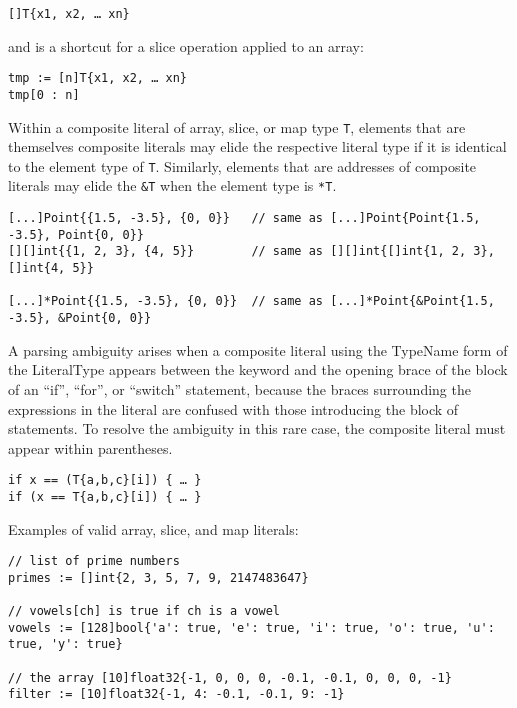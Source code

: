 {\begin{Verbatim}[frame=single]
[]T{x1, x2, … xn}
\end{Verbatim}

and is a shortcut for a slice operation applied to an array:

\begin{Verbatim}[frame=single]
tmp := [n]T{x1, x2, … xn}
tmp[0 : n]
\end{Verbatim}

Within a composite literal of array, slice, or map type \texttt{T},
elements that are themselves composite literals may elide the respective
literal type if it is identical to the element type of \texttt{T}.
Similarly, elements that are addresses of composite literals may elide
the \texttt{\&T} when the element type is \texttt{*T}.

\begin{Verbatim}[frame=single]
[...]Point{{1.5, -3.5}, {0, 0}}   // same as [...]Point{Point{1.5, -3.5}, Point{0, 0}}
[][]int{{1, 2, 3}, {4, 5}}        // same as [][]int{[]int{1, 2, 3}, []int{4, 5}}

[...]*Point{{1.5, -3.5}, {0, 0}}  // same as [...]*Point{&Point{1.5, -3.5}, &Point{0, 0}}
\end{Verbatim}

A parsing ambiguity arises when a composite literal using the TypeName
form of the LiteralType appears between the keyword
and the opening brace of the block of an ``if'', ``for'', or ``switch''
statement, because the braces surrounding the expressions in the literal
are confused with those introducing the block of statements. To resolve
the ambiguity in this rare case, the composite literal must appear
within parentheses.

\begin{Verbatim}[frame=single]
if x == (T{a,b,c}[i]) { … }
if (x == T{a,b,c}[i]) { … }
\end{Verbatim}

Examples of valid array, slice, and map literals:

\begin{Verbatim}[frame=single]
// list of prime numbers
primes := []int{2, 3, 5, 7, 9, 2147483647}

// vowels[ch] is true if ch is a vowel
vowels := [128]bool{'a': true, 'e': true, 'i': true, 'o': true, 'u': true, 'y': true}

// the array [10]float32{-1, 0, 0, 0, -0.1, -0.1, 0, 0, 0, -1}
filter := [10]float32{-1, 4: -0.1, -0.1, 9: -1}


\end{Verbatim}}
